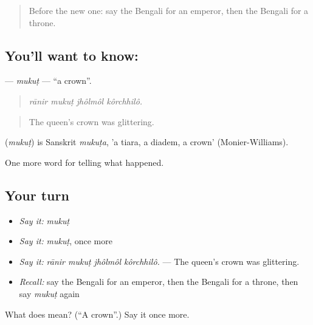 \begin{quote}
Before the new one: say the Bengali for an emperor, then the Bengali for a throne.
\end{quote}

\subsection*{You'll want to know: }
\textbf{} — \emph{mukuṭ} — \textquotedblleft{}a crown\textquotedblright{}.

\begin{quote}
   
\end{quote}

\begin{quote}
\emph{rānir mukuṭ jhôlmôl kôrchhilô.}
\end{quote}

\begin{quote}
The queen's crown was glittering.
\end{quote}

\begin{cousinweb}
\textbf{} (\emph{mukuṭ}) is Sanskrit \emph{mukuṭa}, 'a tiara, a diadem, a crown' (Monier-Williams).
\end{cousinweb}

\begin{grammarlens}[title={What you've built}]
One more word for telling what happened.
\end{grammarlens}

\subsection*{Your turn}
\begin{itemize}
\raggedright
  \item \emph{Say it:} \emph{mukuṭ}
  \item \emph{Say it:} \emph{mukuṭ}, once more
  \item \emph{Say it:} \emph{rānir mukuṭ jhôlmôl kôrchhilô.} — The queen's crown was glittering.
  \item \emph{Recall:} say the Bengali for an emperor, then the Bengali for a throne, then say \emph{mukuṭ} again
\end{itemize}

\begin{tcolorbox}[breakable,colback=teal!4,colframe=teal!35!black,title={Before you move on}]
What does  mean? (\textquotedblleft{}A crown\textquotedblright{}.) Say it once more.
\end{tcolorbox}
